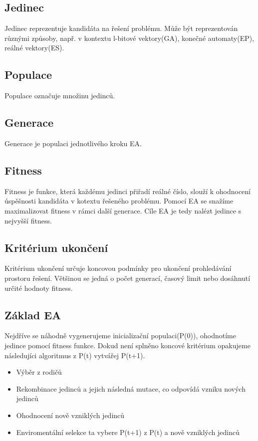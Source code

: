 \subsection{Jedinec}
Jedinec reprezentuje kandidáta na řešení problému. Může být reprezentován různými způsoby, např. v kontextu l-bitové vektory(GA), konečné automaty(EP), reálné vektory(ES). 
\subsection{Populace}
Populace označuje množinu jedinců.
\subsection{Generace}
Generace je populaci jednotlivého kroku EA.
\subsection{Fitness}
Fitness je funkce, která každému jedinci přiřadí reálné číslo, slouží k ohodnocení úspěšnosti kandidáta v kotextu řešeného problému. Pomocí EA se snažíme maximalizovat fitness v rámci další generace. Cíle EA je tedy nalézt jedince s nejvyšší fitness. 
\subsection{Kritérium ukončení}
Kritérium ukončení určuje koncovou podmínky pro ukončení prohledávání prostoru řešení. Většinou se jedná o počet generací, časový limit nebo dosáhnutí určité hodnoty fitness.  
\subsection{Základ EA}
Nejdříve se náhodně vygenerujeme inicializační populaci(P(0)), ohodnotíme jedince pomocí fitness funkce. Dokud není splněno koncové kritérium opakujeme následujíci algoritmus z P(t) vytvářej P(t+1). 
\begin{itemize}
    \item Výběr z rodičů 
    \item Rekombinace jedinců a jejich následná mutace, co odpovídá vzniku nových jedinců
    \item Ohodnocení nově vzniklých jedinců
    \item Enviromentální selekce ta vybere P(t+1) z P(t) a nově vzniklých jedinců
\end{itemize}
